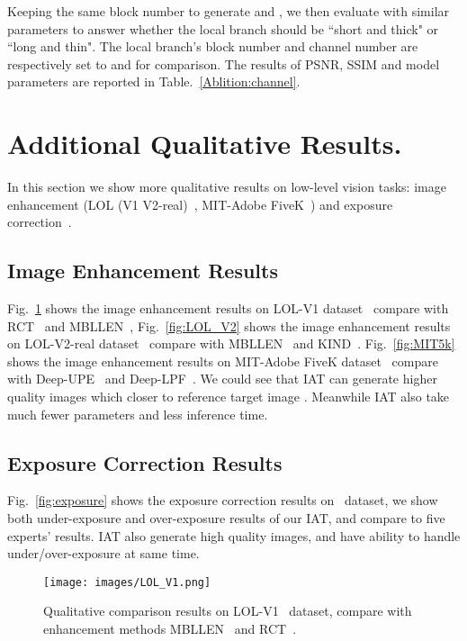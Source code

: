\documentclass{bmvc2k}
\begin{document}
Keeping the same block number to generate  and , we then evaluate with similar parameters to answer whether the local branch should be ``short and thick" or ``long and thin". The local branch's block number and channel number are respectively set to  and  for comparison. The results of PSNR, SSIM and model parameters are reported in Table.~\ref{Ablition:channel}.


\section{Additional Qualitative Results.}
\setcounter{table}{0}
\setcounter{figure}{0}

In this section we show more qualitative results on low-level vision tasks: image enhancement (LOL (V1  V2-real)~\cite{LOL_dataset}, MIT-Adobe FiveK~\cite{fivek_dataset}) and exposure correction~\cite{Exposure_2021_CVPR}.

\subsection{Image Enhancement Results}

Fig.~\ref{fig:LOL_V1} shows the image enhancement results on LOL-V1 dataset~\cite{LOL_dataset} compare with RCT~\cite{RCT_ICCV21} and MBLLEN~\cite{Lv2018MBLLEN}, Fig.~\ref{fig:LOL_V2} shows the image enhancement results on LOL-V2-real dataset~\cite{LOL_dataset} compare with MBLLEN~\cite{Lv2018MBLLEN} and KIND~\cite{KIND}. Fig.~\ref{fig:MIT5k} shows the image enhancement results on MIT-Adobe FiveK dataset~\cite{fivek_dataset} compare with Deep-UPE~\cite{DeepUPE_2019_CVPR} and Deep-LPF~\cite{Deep_LPF}. We could see that IAT can generate higher quality images which closer to reference target image . Meanwhile IAT also take much fewer parameters and less inference time. 

\subsection{Exposure Correction Results}
Fig.~\ref{fig:exposure} shows the exposure correction results on~\cite{Exposure_2021_CVPR} dataset, we show both under-exposure and over-exposure results of our IAT, and compare to five experts' results. IAT also generate high quality images, and have ability to handle under/over-exposure at same time.

\begin{figure}[t]
    \centering
    \texttt{[image: images/LOL\_V1.png]}
\caption{Qualitative comparison results on  LOL-V1~\cite{LOL_dataset} dataset, compare with enhancement methods MBLLEN~\cite{Lv2018MBLLEN} and RCT~\cite{RCT_ICCV21}.}
    \label{fig:LOL_V1}
\end{figure}
\end{document}
